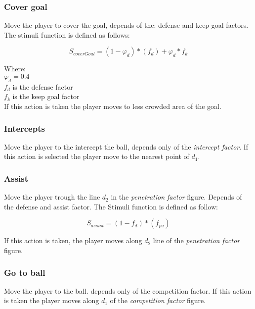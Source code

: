 \documentclass[
10pt, %
a4paper, %
oneside, %
headinclude,footinclude, %
BCOR5mm, %
]{scrartcl}
\begin{document}
\subsubsection{Cover goal}

Move the player to cover the goal, depends of the: defense and keep goal factors. The stimuli function is defined as follows:

\begin{equation}
	S_{coverGoal} = (1 - \varphi_d) * (f_d) + \varphi_d * f_k
\end{equation} 

Where:\\
$\varphi_d = 0.4$\\
$f_d$ is the defense factor\\
$f_k$ is the keep goal factor\\


If this action is taken the player moves to less crowded area of the goal.

\subsubsection{Intercepts}
Move the player to the intercept the ball, depends only of the \textit{intercept factor}. If this action is selected the player move to the nearest point of $d_1$.

\subsubsection{Assist}
Move the player trough the line $d_2$ in the \textit{penetration factor} figure. Depends of the defense and assist factor. The Stimuli function is defined as follow:

\begin{equation}
	S_{assist} = (1-f_d) * (f_{pa})
\end{equation}

If this action is taken, the player moves along $d_2$ line of the \textit{penetration factor} figure.

\subsubsection{Go to ball}

Move the player to the ball. depends only of the competition factor. If this action is taken the player moves along $d_1$ of the \textit{competition factor} figure.


\end{document}
